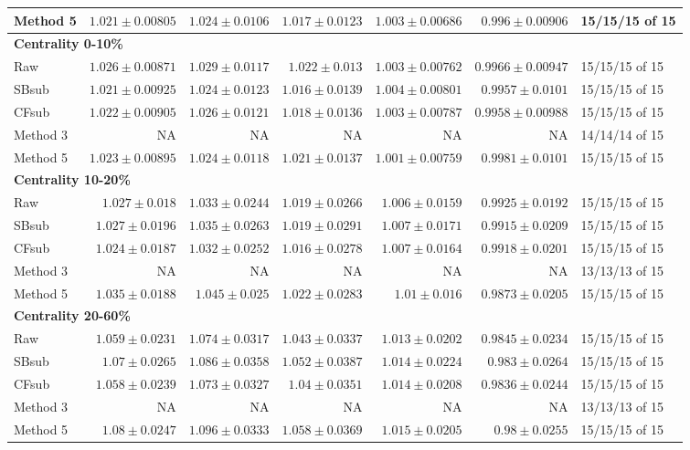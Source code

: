 \documentclass[10pt,a4paper]{article}
\begin{document}
{\begin{longtable}{lrrrrrl}
Method 5 & $1.021\pm0.00805$ & $1.024\pm0.0106$ & $1.017\pm0.0123$ & $1.003\pm0.00686$ & $0.996\pm0.00906$ & 15/15/15 of 15\\
\hline
\multicolumn{7}{l}{\textbf{Centrality 0-10\%}}\\
Raw & $1.026\pm0.00871$ & $1.029\pm0.0117$ & $1.022\pm0.013$ & $1.003\pm0.00762$ & $0.9966\pm0.00947$ & 15/15/15 of 15\\
SBsub & $1.021\pm0.00925$ & $1.024\pm0.0123$ & $1.016\pm0.0139$ & $1.004\pm0.00801$ & $0.9957\pm0.0101$ & 15/15/15 of 15\\
CFsub & $1.022\pm0.00905$ & $1.026\pm0.0121$ & $1.018\pm0.0136$ & $1.003\pm0.00787$ & $0.9958\pm0.00988$ & 15/15/15 of 15\\
Method 3 & NA & NA & NA & NA & NA & 14/14/14 of 15\\
Method 5 & $1.023\pm0.00895$ & $1.024\pm0.0118$ & $1.021\pm0.0137$ & $1.001\pm0.00759$ & $0.9981\pm0.0101$ & 15/15/15 of 15\\
\hline
\multicolumn{7}{l}{\textbf{Centrality 10-20\%}}\\
Raw & $1.027\pm0.018$ & $1.033\pm0.0244$ & $1.019\pm0.0266$ & $1.006\pm0.0159$ & $0.9925\pm0.0192$ & 15/15/15 of 15\\
SBsub & $1.027\pm0.0196$ & $1.035\pm0.0263$ & $1.019\pm0.0291$ & $1.007\pm0.0171$ & $0.9915\pm0.0209$ & 15/15/15 of 15\\
CFsub & $1.024\pm0.0187$ & $1.032\pm0.0252$ & $1.016\pm0.0278$ & $1.007\pm0.0164$ & $0.9918\pm0.0201$ & 15/15/15 of 15\\
Method 3 & NA & NA & NA & NA & NA & 13/13/13 of 15\\
Method 5 & $1.035\pm0.0188$ & $1.045\pm0.025$ & $1.022\pm0.0283$ & $1.01\pm0.016$ & $0.9873\pm0.0205$ & 15/15/15 of 15\\
\hline
\multicolumn{7}{l}{\textbf{Centrality 20-60\%}}\\
Raw & $1.059\pm0.0231$ & $1.074\pm0.0317$ & $1.043\pm0.0337$ & $1.013\pm0.0202$ & $0.9845\pm0.0234$ & 15/15/15 of 15\\
SBsub & $1.07\pm0.0265$ & $1.086\pm0.0358$ & $1.052\pm0.0387$ & $1.014\pm0.0224$ & $0.983\pm0.0264$ & 15/15/15 of 15\\
CFsub & $1.058\pm0.0239$ & $1.073\pm0.0327$ & $1.04\pm0.0351$ & $1.014\pm0.0208$ & $0.9836\pm0.0244$ & 15/15/15 of 15\\
Method 3 & NA & NA & NA & NA & NA & 13/13/13 of 15\\
Method 5 & $1.08\pm0.0247$ & $1.096\pm0.0333$ & $1.058\pm0.0369$ & $1.015\pm0.0205$ & $0.98\pm0.0255$ & 15/15/15 of 15\\
\hline
\end{longtable}}
\end{document}
